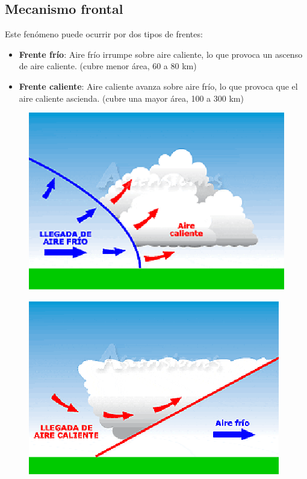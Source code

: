 \subsection{Mecanismo frontal}

Este fenómeno puede ocurrir por dos tipos de frentes: 
\begin{itemize}
    \item \textbf{Frente frío}: Aire frío irrumpe sobre aire caliente, lo que provoca un ascenso de aire caliente. (cubre menor área, 60 a 80 km)
    \item \textbf{Frente caliente}: Aire caliente avanza sobre aire frío, lo que provoca que el aire caliente ascienda. (cubre una mayor área, 100 a 300 km)
\end{itemize}

\begin{figure}[!htbp]
    \centering
    \begin{minipage}{0.35\textwidth} %
        \centering
        \includegraphics[width=\textwidth]{imagenes/frente_frio.png}
        \label{fig:frente_frio}
    \end{minipage}
    \hspace{0.05\textwidth} %
    \begin{minipage}{0.35\textwidth}
        \centering
        \includegraphics[width=\textwidth]{imagenes/frente_caliente.png}

\end{minipage}
\end{figure}
